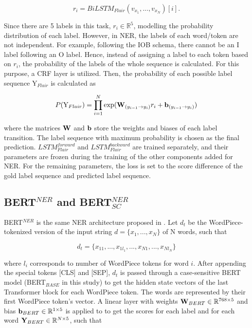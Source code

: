 \documentclass{report}
\theoremstyle{definition}
\theoremstyle{remark}
\begin{document}
\begin{equation}
    r_i = BiLSTM_{Flair}(v_{x_1},...,v_{x_N})[i].
\end{equation}

Since there are 5 labels in this task, $r_i \in \mathbb{R}^5$, modelling the probability distribution of each label. However, in NER, the labels of each word/token are not independent. For example, following the IOB schema, there cannot be an I label following an O label. Hence, instead of assigning a label to each token based on $r_i$, the probability of the labels of the whole sequence is calculated. For this purpose, a CRF layer is utilized. Then, the probability of each possible label sequence $\text{Y}_{Flair}$ is calculated as 

\begin{equation}
    P(\text{Y}_{Flair}) = \prod_{i=1}^N \text{exp}( \bold{W}_{(y_{i-1} \rightarrow y_i)}r_i + \bold{b}_{(y_{i-1} \rightarrow y_i)})
\end{equation}

where the matrices $\bold{W}$ and $\bold{b}$ store the weights and biases of each label transition. The label sequence with maximum probability is chosen as the final prediction. $LSTM^{forward}_{Flair}$ and $LSTM^{backward}_{Flair}$ are trained separately, and their parameters are frozen during the training of the other components added for NER. For the remaining parameters, the loss is set to the score difference of the gold label sequence and predicted label sequence.

\subsection{BERT$^{NER}$ and BERT$^{NER}_{SC}$}
BERT$^{NER}$ is the same NER architecture proposed in \cite{BERT}. Let $d_t$ be the WordPiece-tokenized version of the input string $d=\{x_1,...,x_N\}$ of N words, such that

\begin{equation}
    d_t = \{x_{11},...,x_{1l_{1}},...,x_{N1},...,x_{Nl_{N}}\}
\end{equation}

where $l_i$ corresponds to number of WordPiece tokens for word $i$. After appending the special tokens [CLS] and [SEP], $d_t$ is passed through a case-sensitive BERT model (BERT$_{BASE}$ in this study) to get the hidden state vectors of the last Transformer block for each WordPiece token. The words are represented by their first WordPiece token's vector. A linear layer with weights $\bold{W}_{BERT} \in \mathbb{R}^{768\times5}$ and bias $\bold{b}_{BERT} \in \mathbb{R}^{1\times5}$ is applied to to get the scores for each label and for each word $\bold{Y}_{BERT} \in \mathbb{R}^{N\times5}$, such that
\end{document}
